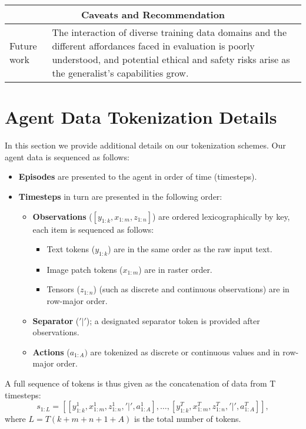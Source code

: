 \documentclass[10pt]{article} \usepackage[accepted]{tmlr}
\begin{document}
\begin{longtable}{p{}|p{}}
\toprule
\multicolumn{2}{c}{\textbf{Caveats and Recommendation}}\\
\midrule
Future work & The interaction of diverse training data domains and the different affordances faced in evaluation is poorly understood, and potential ethical and safety risks arise as the generalist's capabilities grow. \\

\bottomrule

\end{longtable} \newpage

\section{Agent Data Tokenization Details}
\label{sec:tokenization_appendix}
In this section we provide additional details on our tokenization schemes.
Our agent data is sequenced as follows:
\begin{itemize}
    \item \textbf{Episodes} are presented to the agent in order of time (timesteps).
    \item \textbf{Timesteps} in turn are presented in the following order:
    \begin{itemize}
        \item \textbf{Observations} ($[y_{1:k}, x_{1:m}, z_{1:n}]$) are ordered lexicographically by key, each item is sequenced as follows:
        \begin{itemize}
            \item Text tokens ($y_{1:k}$) are in the same order as the raw input text.
            \item Image patch tokens  ($x_{1:m}$) are in raster order.
            \item Tensors ($z_{1:n}$) (such as discrete and continuous observations) are in row-major order.
        \end{itemize}
        \item \textbf{Separator} ($'|'$); a designated separator token is provided after observations.
        \item \textbf{Actions} ($a_{1:A})$ are tokenized as discrete or continuous values and in row-major order.
    \end{itemize}
\end{itemize}
A full sequence of tokens is thus given as the concatenation of data from T timesteps: 
$$
s_{1:L} = [[y^1_{1:k}, x^1_{1:m}, z^1_{1:n}, '|', a^1_{1:A} ], \dots, [y^T_{1:k}, x^T_{1:m}, z^T_{1:n}, '|', a^T_{1:A} ]],
$$
where $L = T (k + m + n + 1 + A)$ is the total number of tokens. 
\end{document}
